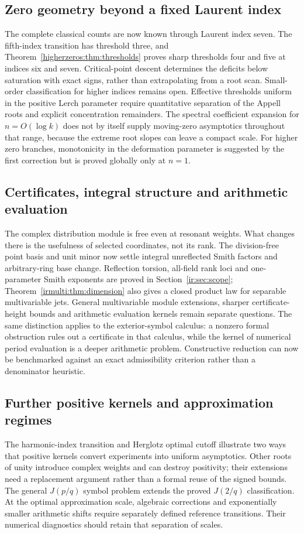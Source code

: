 \subsection{Zero geometry beyond a fixed Laurent index}
The complete classical counts are now known through Laurent index seven.
The fifth-index transition has threshold three, and
Theorem~\ref{higherzeros:thm:thresholds} proves sharp thresholds four and
five at indices six and seven. Critical-point descent determines the
deficits below saturation with exact signs, rather than extrapolating from
a root scan. Small-order classification for higher indices remains open.
Effective thresholds uniform in the positive Lerch
parameter require quantitative separation of the Appell roots and explicit
concentration remainders. The spectral coefficient expansion for
$n=O(\log k)$ does not by itself supply moving-zero asymptotics throughout
that range, because the extreme root slopes can leave a compact scale.
For higher zero branches, monotonicity in the deformation parameter is
suggested by the first correction but is proved globally only at $n=1$.

\subsection{Certificates, integral structure and arithmetic evaluation}
The complex distribution module is free even at resonant weights. What
changes there is the usefulness of selected coordinates, not its rank.
The division-free point basis and unit minor now settle integral
unreflected Smith factors and arbitrary-ring base change. Reflection
torsion, all-field rank loci and one-parameter Smith exponents are proved
in Section~\ref{ir:sec:scope}; Theorem~\ref{irmulti:thm:dimension}
also gives a closed product law for separable multivariable jets. General
multivariable module extensions, sharper certificate-height bounds and
arithmetic evaluation kernels remain separate questions. The same distinction
applies to the exterior-symbol calculus: a nonzero formal obstruction rules
out a certificate in that calculus, while the kernel of numerical period
evaluation is a deeper arithmetic problem. Constructive reduction can now
be benchmarked against an exact admissibility criterion rather than a
denominator heuristic.

\subsection{Further positive kernels and approximation regimes}
The harmonic-index transition and Herglotz optimal cutoff illustrate two
ways that positive kernels convert experiments into uniform asymptotics.
Other roots of unity introduce complex weights and can destroy positivity;
their extensions need a replacement argument rather than a formal reuse of
the signed bounds. The general $J(p/q)$ symbol problem extends the proved
$J(2/q)$ classification. At the optimal approximation scale, algebraic
corrections and exponentially smaller arithmetic shifts require separately
defined reference transitions. Their numerical diagnostics should retain
that separation of scales.

